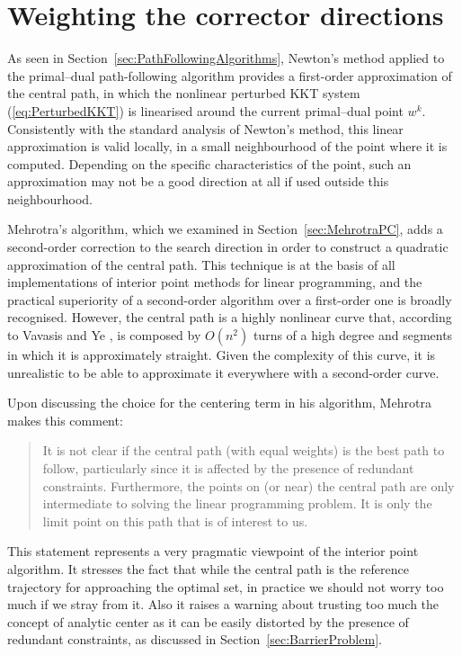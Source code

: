 %
%
\section{Weighting the corrector directions}

As seen in Section~\ref{sec:PathFollowingAlgorithms},
Newton's method applied to the primal--dual path-following algorithm 
provides a first-order approximation of the central path, in which
the nonlinear perturbed KKT system (\ref{eq:PerturbedKKT}) 
is linearised around the current primal--dual point $w^k$. Consistently with 
the standard analysis of Newton's method, this linear approximation 
is valid locally, in a small neighbourhood of the point where 
it is computed. Depending on the specific characteristics of the point, 
such an approximation may not be a good direction at all 
if used outside this neighbourhood.

Mehrotra's algorithm, which we examined in 
Section~\ref{sec:MehrotraPC}, adds a second-order correction to the search 
direction in order to construct a quadratic approximation 
of the central path. This technique is at the basis of all
implementations of interior point methods for linear programming,
and the practical superiority of a second-order algorithm over 
a first-order one is broadly recognised.
However, the central path is a highly nonlinear curve that, according 
to Vavasis and Ye \cite{VavasisYe}, is composed by $O(n^2)$ turns 
of a high degree and segments in which it is approximately straight. 
Given the complexity of this curve, it is unrealistic to be able 
to approximate it everywhere with a second-order curve.

Upon discussing the choice for the centering term in his algorithm,
Mehrotra \cite{Mehrotra92} makes this comment:
\begin{quotation}
It is not clear if the central path (with
equal weights) is the best path to follow, particularly since it
is affected by the presence of redundant constraints. Furthermore,
the points on (or near) the central path are only intermediate to
solving the linear programming problem. It is only the limit point 
on this path that is of interest to us.
\end{quotation}
This statement represents a very pragmatic viewpoint of the interior
point algorithm. It stresses the fact that while the central path
is the reference trajectory for approaching the optimal set,
in practice we should not worry too much if we stray from it.
Also it raises a warning about trusting too much the concept
of analytic center as it can be easily distorted by the presence
of redundant constraints, as discussed in Section~\ref{sec:BarrierProblem}.

